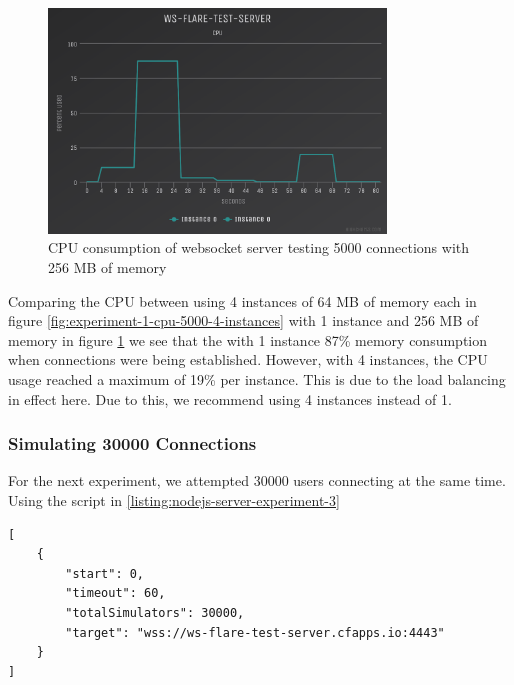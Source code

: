 \begin{figure}[H]
  \centering
    \includegraphics[width=0.8\textwidth]{figures/experiments/experiment-1/node-js/cpu-5000-256-memory.png}
    \caption{CPU consumption of websocket server testing 5000 connections with 256 MB of memory}
    \label{fig:experiment-1-cpu-5000-1-instances-256-mem}
\end{figure}

Comparing the CPU between using 4 instances of 64 MB of memory each in figure \ref{fig:experiment-1-cpu-5000-4-instances} with 1 instance and 256 MB of memory in figure \ref{fig:experiment-1-cpu-5000-1-instances-256-mem} we see that the with 1 instance 87\% memory consumption when connections were being established. However, with 4 instances, the CPU usage reached a maximum of 19\% per instance. This is due to the load balancing in effect here. Due to this, we recommend using 4 instances instead of 1. 

\subsubsection{Simulating 30000 Connections}

For the next experiment, we attempted 30000 users connecting at the same time. Using the script in \ref{listing:nodejs-server-experiment-3}

\begin{listing}[H]
    \caption{WS-Flare test script for 5000 users}
    \label{listing:nodejs-server-experiment-3}
    \begin{verbatim}
[
    {
        "start": 0,
        "timeout": 60,
        "totalSimulators": 30000,
        "target": "wss://ws-flare-test-server.cfapps.io:4443"
    }
]
\end{verbatim}
\end{listing}

